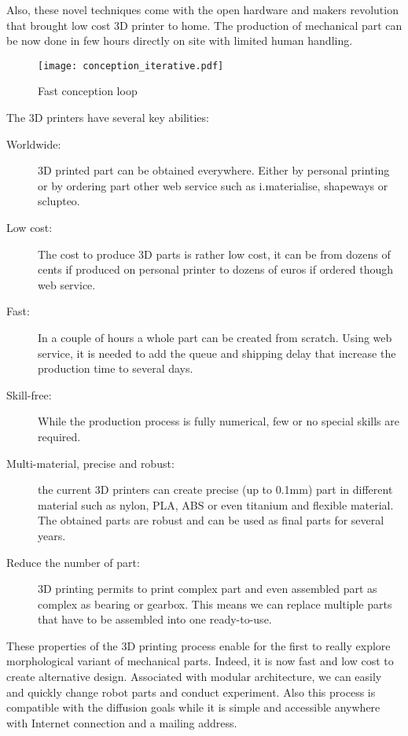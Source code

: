 Also, these novel techniques come with the open hardware and makers revolution that brought low cost 3D printer to home. The production of mechanical part can be now done in few hours directly on site with limited human handling.

\begin{figure}[tb]
    \begin{center}
        \texttt{[image: conception\_iterative.pdf]}
    \end{center}
    \caption{Fast conception loop}
    \label{fig:conception_loop}
\end{figure}

The 3D printers have several key abilities:
\begin{description}
    \item[Worldwide:] 3D printed part can be obtained everywhere. Either by personal printing or by ordering part other web service such as i.materialise, shapeways or sclupteo.
    \item[Low cost:] The cost to produce 3D parts is rather low cost, it can be from dozens of cents if produced on personal printer to dozens of euros if ordered though web service.
    \item[Fast:] In a couple of hours a whole part can be created from scratch. Using web service, it is needed to add the queue and shipping delay that increase the production time to several days.
    \item[Skill-free:] While the production process is fully numerical, few or no special skills are required.
    \item[Multi-material, precise and robust:] the current 3D printers can create precise (up to 0.1mm) part in different material such as nylon, PLA, ABS or even titanium and flexible material. The obtained parts are robust and can be used as final parts for several years.
    \item[Reduce the number of part:] 3D printing permits to print complex part and even assembled part as complex as bearing or gearbox. This means we can replace multiple parts that have to be assembled into one ready-to-use.
\end{description}



These properties of the 3D printing process enable for the first to really explore morphological variant of mechanical parts. Indeed, it is now fast and low cost to create alternative design. Associated with modular architecture, we can easily and quickly change robot parts and conduct experiment. Also this process is compatible with the diffusion goals while it is simple and accessible anywhere with Internet connection and a mailing address.


